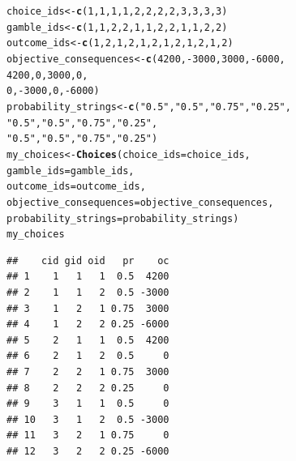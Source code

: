 \documentclass{article}\usepackage[]{graphicx}\usepackage[]{color}
\makeatletter
\newcommand{\hlnum}[1]{\textcolor[rgb]{0.686,0.059,0.569}{#1}}%
\newcommand{\hlstr}[1]{\textcolor[rgb]{0.192,0.494,0.8}{#1}}%
\newcommand{\hlopt}[1]{\textcolor[rgb]{0,0,0}{#1}}%
\newcommand{\hlstd}[1]{\textcolor[rgb]{0.345,0.345,0.345}{#1}}%
\newcommand{\hlkwb}[1]{\textcolor[rgb]{0.69,0.353,0.396}{#1}}%
\newcommand{\hlkwc}[1]{\textcolor[rgb]{0.333,0.667,0.333}{#1}}%
\newcommand{\hlkwd}[1]{\textcolor[rgb]{0.737,0.353,0.396}{\textbf{#1}}}%
\newenvironment{kframe}{%
 \def\at@end@of@kframe{}%
 \ifinner\ifhmode%
  \def\at@end@of@kframe{\end{minipage}}%
  \begin{minipage}{\columnwidth}%
 \fi\fi%
 \def\FrameCommand##1{\hskip\@totalleftmargin \hskip-\fboxsep
 \colorbox{shadecolor}{##1}\hskip-\fboxsep
     \hskip-\linewidth \hskip-\@totalleftmargin \hskip\columnwidth}%
 \MakeFramed {\advance\hsize-\width
   \@totalleftmargin\z@ \linewidth\hsize
   \@setminipage}}%
 {\par\unskip\endMakeFramed%
 \at@end@of@kframe}
\newenvironment{knitrout}{}{} %
\makeatother
\begin{document}
\begin{knitrout}
\color{fgcolor}\begin{kframe}
\begin{alltt}
\hlstd{choice_ids} \hlkwb{<-} \hlkwd{c}\hlstd{(}\hlnum{1}\hlstd{,} \hlnum{1}\hlstd{,} \hlnum{1}\hlstd{,} \hlnum{1}\hlstd{,} \hlnum{2}\hlstd{,} \hlnum{2}\hlstd{,} \hlnum{2}\hlstd{,} \hlnum{2}\hlstd{,} \hlnum{3}\hlstd{,} \hlnum{3}\hlstd{,} \hlnum{3}\hlstd{,} \hlnum{3}\hlstd{)}
\hlstd{gamble_ids} \hlkwb{<-} \hlkwd{c}\hlstd{(}\hlnum{1}\hlstd{,} \hlnum{1}\hlstd{,} \hlnum{2}\hlstd{,} \hlnum{2}\hlstd{,} \hlnum{1}\hlstd{,} \hlnum{1}\hlstd{,} \hlnum{2}\hlstd{,} \hlnum{2}\hlstd{,} \hlnum{1}\hlstd{,} \hlnum{1}\hlstd{,} \hlnum{2}\hlstd{,} \hlnum{2}\hlstd{)}
\hlstd{outcome_ids} \hlkwb{<-} \hlkwd{c}\hlstd{(}\hlnum{1}\hlstd{,} \hlnum{2}\hlstd{,} \hlnum{1}\hlstd{,} \hlnum{2}\hlstd{,} \hlnum{1}\hlstd{,} \hlnum{2}\hlstd{,} \hlnum{1}\hlstd{,} \hlnum{2}\hlstd{,} \hlnum{1}\hlstd{,} \hlnum{2}\hlstd{,} \hlnum{1}\hlstd{,} \hlnum{2}\hlstd{)}
\hlstd{objective_consequences} \hlkwb{<-} \hlkwd{c}\hlstd{(}\hlnum{4200}\hlstd{,} \hlopt{-}\hlnum{3000}\hlstd{,} \hlnum{3000}\hlstd{,} \hlopt{-}\hlnum{6000}\hlstd{,}
        \hlnum{4200}\hlstd{,} \hlnum{0}\hlstd{,} \hlnum{3000}\hlstd{,} \hlnum{0}\hlstd{,}
        \hlnum{0}\hlstd{,} \hlopt{-}\hlnum{3000}\hlstd{,} \hlnum{0}\hlstd{,} \hlopt{-}\hlnum{6000}\hlstd{)}
\hlstd{probability_strings} \hlkwb{<-} \hlkwd{c}\hlstd{(}\hlstr{"0.5"}\hlstd{,} \hlstr{"0.5"}\hlstd{,} \hlstr{"0.75"}\hlstd{,} \hlstr{"0.25"}\hlstd{,}
        \hlstr{"0.5"}\hlstd{,} \hlstr{"0.5"}\hlstd{,} \hlstr{"0.75"}\hlstd{,} \hlstr{"0.25"}\hlstd{,}
        \hlstr{"0.5"}\hlstd{,} \hlstr{"0.5"}\hlstd{,} \hlstr{"0.75"}\hlstd{,} \hlstr{"0.25"}\hlstd{)}
\hlstd{my_choices} \hlkwb{<-} \hlkwd{Choices}\hlstd{(}\hlkwc{choice_ids}\hlstd{=choice_ids,}
        \hlkwc{gamble_ids}\hlstd{=gamble_ids,}
        \hlkwc{outcome_ids}\hlstd{=outcome_ids,}
        \hlkwc{objective_consequences}\hlstd{=objective_consequences,}
        \hlkwc{probability_strings}\hlstd{=probability_strings)}
\hlstd{my_choices}
\end{alltt}
\begin{verbatim}
##    cid gid oid   pr    oc
## 1    1   1   1  0.5  4200
## 2    1   1   2  0.5 -3000
## 3    1   2   1 0.75  3000
## 4    1   2   2 0.25 -6000
## 5    2   1   1  0.5  4200
## 6    2   1   2  0.5     0
## 7    2   2   1 0.75  3000
## 8    2   2   2 0.25     0
## 9    3   1   1  0.5     0
## 10   3   1   2  0.5 -3000
## 11   3   2   1 0.75     0
## 12   3   2   2 0.25 -6000

\end{verbatim}
\end{kframe}
\end{knitrout}
\end{document}
